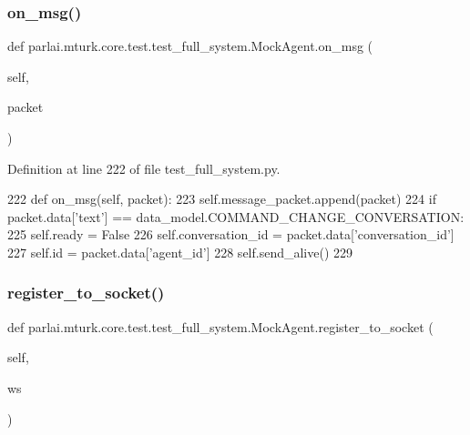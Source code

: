 \subsubsection{\texorpdfstring{on\+\_\+msg()}{on\_msg()}}
{\footnotesize\ttfamily def parlai.\+mturk.\+core.\+test.\+test\+\_\+full\+\_\+system.\+Mock\+Agent.\+on\+\_\+msg (\begin{DoxyParamCaption}\item[{}]{self,  }\item[{}]{packet }\end{DoxyParamCaption})}



Definition at line 222 of file test\+\_\+full\+\_\+system.\+py.


\begin{DoxyCode}
222     \textcolor{keyword}{def }on\_msg(self, packet):
223         self.message\_packet.append(packet)
224         \textcolor{keywordflow}{if} packet.data[\textcolor{stringliteral}{'text'}] == data\_model.COMMAND\_CHANGE\_CONVERSATION:
225             self.ready = \textcolor{keyword}{False}
226             self.conversation\_id = packet.data[\textcolor{stringliteral}{'conversation\_id'}]
227             self.id = packet.data[\textcolor{stringliteral}{'agent\_id'}]
228             self.send\_alive()
229 
\end{DoxyCode}
\mbox{\label{classparlai_1_1mturk_1_1core_1_1test_1_1test__full__system_1_1MockAgent_aa3aaa3fa10d7f1ca6a135bcd28e18be4}} 
\subsubsection{\texorpdfstring{register\+\_\+to\+\_\+socket()}{register\_to\_socket()}}
{\footnotesize\ttfamily def parlai.\+mturk.\+core.\+test.\+test\+\_\+full\+\_\+system.\+Mock\+Agent.\+register\+\_\+to\+\_\+socket (\begin{DoxyParamCaption}\item[{}]{self,  }\item[{}]{ws }\end{DoxyParamCaption})}



